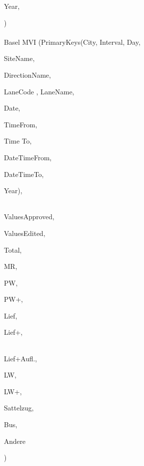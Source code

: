 \documentclass{article}
\begin{document}
\begin{center}
\begin{tabbing}
Year,

)\\\\

    Basel MVI \> (PrimaryKeys(City, Interval, Day,

SiteName,

DirectionName,

LaneCode
,
LaneName,
\\ \>

Date,

TimeFrom,

Time To,

DateTimeFrom,

DateTimeTo,

Year),

\\ \> ValuesApproved,

ValuesEdited,

Total,

MR,

PW,

PW+,

Lief,

Lief+,

\\ \> Lief+Aufl.,

LW,

LW+,

Sattelzug,

Bus,

Andere

)\\\\
    
\end{tabbing}    
\end{center}
\end{document}
